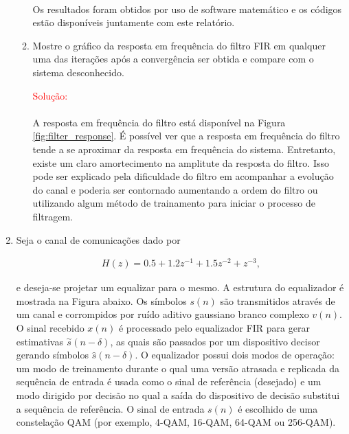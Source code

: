 \documentclass[a4paper,10pt]{article}
\begin{document}
\begin{enumerate}
\begin{enumerate}
						\paragraph{}Os resultados foram obtidos por uso de software matemático e os códigos estão disponíveis juntamente com este relatório.

					\item Mostre o gráﬁco da resposta em frequência do ﬁltro FIR em qualquer uma das iterações após a convergência ser obtida e compare com o sistema desconhecido.
					
						\textcolor{red}{Solução:}

						\paragraph{}A resposta em frequência do filtro está disponível na Figura \ref{fig:filter_response}. É possível ver que a resposta em frequência do filtro
						tende a se aproximar da resposta em frequência do sistema. Entretanto, existe um claro amortecimento na amplitute da resposta do filtro. Isso pode ser explicado
						pela dificuldade do filtro em acompanhar a evolução do canal e poderia ser contornado aumentando a ordem do filtro ou utilizando algum método de trainamento para
						iniciar o processo de filtragem.  

				\end{enumerate}
			
			\item Seja o canal de comunicações dado por
			
				\begin{align}
					H(z) = 0.5 + 1.2z^{-1} + 1.5z^{-2} + z^{-3},
				\end{align}
				
				e deseja-se projetar um equalizar para o mesmo. A estrutura do equalizador é mostrada na Figura abaixo. Os símbolos $s(n)$ são transmitidos através de um canal e corrompidos por ruído aditivo gaussiano branco complexo $v(n)$. O sinal recebido $x(n)$ é processado pelo equalizador FIR para gerar estimativas $\overset{\sim}{s}(n - \delta)$, as quais são passados por um dispositivo decisor gerando  símbolos $\hat{s}(n - \delta)$. O equalizador possui dois modos de operação: um modo de treinamento durante o qual uma versão atrasada e  replicada da sequência de entrada é usada como o sinal de referência (desejado) e um modo dirigido por decisão no qual a saída do dispositivo de decisão substitui a sequência de referência. O sinal de entrada $s(n)$ é escolhido de uma constelação QAM (por exemplo, 4-QAM, 16-QAM, 64-QAM ou 256-QAM).
				

\end{enumerate}
\end{document}
